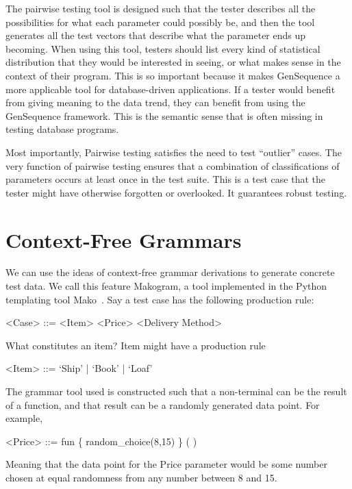 The pairwise testing tool is designed such that the tester describes all the possibilities for what each parameter could possibly be, and then the tool generates all the test vectors that describe what the parameter ends up becoming. When using this tool, testers should list every kind of statistical distribution that they would be interested in seeing, or what makes sense in the context of their program. This is so important because it makes GenSequence a more applicable tool for database-driven applications. If a tester would benefit from giving meaning to the data trend, they can benefit from using the GenSequence framework. This is the semantic sense that is often missing in testing database programs.

Most importantly, Pairwise testing satisfies the need to test ``outlier'' cases. The very function of pairwise testing ensures that a combination of classifications of parameters occurs at least once in the test suite. This is a test case that the tester might have otherwise forgotten or overlooked. It guarantees robust testing.

\section{Context-Free Grammars}
We can use the ideas of context-free grammar derivations to generate concrete test data. We call this feature Makogram, a tool implemented in the Python templating tool Mako~\cite{Mako:Template}. Say a test case has the following production rule:

\begin{grammar}
<Case> ::= <Item> <Price> <Delivery Method>
\end{grammar}

What constitutes an item? Item might have a production rule 
\begin{grammar}
<Item> ::= `Ship' | `Book' | `Loaf'
\end{grammar}

The grammar tool used is constructed such that a non-terminal can be the result of a function, and that result can be a randomly generated data point. For example,

\begin{grammar}
<Price> ::= fun \{ random_choice(8,15) \} ( )
\end{grammar}

Meaning that the data point for the Price parameter would be some number chosen at equal randomness from any number between 8 and 15.

